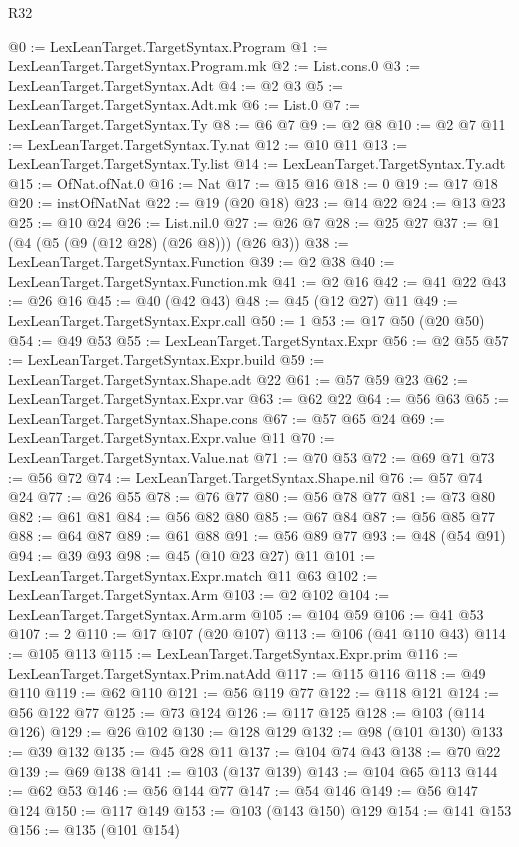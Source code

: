 \begin{lexlean}{R32}
\begin{coremodule}
@0 := LexLeanTarget.TargetSyntax.Program
@1 := LexLeanTarget.TargetSyntax.Program.mk
@2 := List.cons.{0}
@3 := LexLeanTarget.TargetSyntax.Adt
@4 := @2 @3
@5 := LexLeanTarget.TargetSyntax.Adt.mk
@6 := List.{0}
@7 := LexLeanTarget.TargetSyntax.Ty
@8 := @6 @7
@9 := @2 @8
@10 := @2 @7
@11 := LexLeanTarget.TargetSyntax.Ty.nat
@12 := @10 @11
@13 := LexLeanTarget.TargetSyntax.Ty.list
@14 := LexLeanTarget.TargetSyntax.Ty.adt
@15 := OfNat.ofNat.{0}
@16 := Nat
@17 := @15 @16
@18 := 0
@19 := @17 @18
@20 := instOfNatNat
@22 := @19 (@20 @18)
@23 := @14 @22
@24 := @13 @23
@25 := @10 @24
@26 := List.nil.{0}
@27 := @26 @7
@28 := @25 @27
@37 := @1 (@4 (@5 (@9 (@12 @28) (@26 @8))) (@26 @3))
@38 := LexLeanTarget.TargetSyntax.Function
@39 := @2 @38
@40 := LexLeanTarget.TargetSyntax.Function.mk
@41 := @2 @16
@42 := @41 @22
@43 := @26 @16
@45 := @40 (@42 @43)
@48 := @45 (@12 @27) @11
@49 := LexLeanTarget.TargetSyntax.Expr.call
@50 := 1
@53 := @17 @50 (@20 @50)
@54 := @49 @53
@55 := LexLeanTarget.TargetSyntax.Expr
@56 := @2 @55
@57 := LexLeanTarget.TargetSyntax.Expr.build
@59 := LexLeanTarget.TargetSyntax.Shape.adt @22
@61 := @57 @59 @23
@62 := LexLeanTarget.TargetSyntax.Expr.var
@63 := @62 @22
@64 := @56 @63
@65 := LexLeanTarget.TargetSyntax.Shape.cons
@67 := @57 @65 @24
@69 := LexLeanTarget.TargetSyntax.Expr.value @11
@70 := LexLeanTarget.TargetSyntax.Value.nat
@71 := @70 @53
@72 := @69 @71
@73 := @56 @72
@74 := LexLeanTarget.TargetSyntax.Shape.nil
@76 := @57 @74 @24
@77 := @26 @55
@78 := @76 @77
@80 := @56 @78 @77
@81 := @73 @80
@82 := @61 @81
@84 := @56 @82 @80
@85 := @67 @84
@87 := @56 @85 @77
@88 := @64 @87
@89 := @61 @88
@91 := @56 @89 @77
@93 := @48 (@54 @91)
@94 := @39 @93
@98 := @45 (@10 @23 @27) @11
@101 := LexLeanTarget.TargetSyntax.Expr.match @11 @63
@102 := LexLeanTarget.TargetSyntax.Arm
@103 := @2 @102
@104 := LexLeanTarget.TargetSyntax.Arm.arm
@105 := @104 @59
@106 := @41 @53
@107 := 2
@110 := @17 @107 (@20 @107)
@113 := @106 (@41 @110 @43)
@114 := @105 @113
@115 := LexLeanTarget.TargetSyntax.Expr.prim
@116 := LexLeanTarget.TargetSyntax.Prim.natAdd
@117 := @115 @116
@118 := @49 @110
@119 := @62 @110
@121 := @56 @119 @77
@122 := @118 @121
@124 := @56 @122 @77
@125 := @73 @124
@126 := @117 @125
@128 := @103 (@114 @126)
@129 := @26 @102
@130 := @128 @129
@132 := @98 (@101 @130)
@133 := @39 @132
@135 := @45 @28 @11
@137 := @104 @74 @43
@138 := @70 @22
@139 := @69 @138
@141 := @103 (@137 @139)
@143 := @104 @65 @113
@144 := @62 @53
@146 := @56 @144 @77
@147 := @54 @146
@149 := @56 @147 @124
@150 := @117 @149
@153 := @103 (@143 @150) @129
@154 := @141 @153
@156 := @135 (@101 @154)

\end{coremodule}
\end{lexlean}
